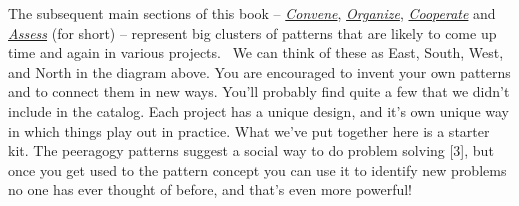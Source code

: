 The subsequent main sections of this book --
\href{http://peeragogy.org/convene/}{\emph{Convene}},
\href{http://peeragogy.org/organize/}{\emph{Organize}},
\href{http://peeragogy.org/facilitate/}{\emph{Cooperate}} and
\href{http://peeragogy.org/assessment/}{\emph{Assess}} (for short) --
represent big clusters of patterns that are likely to come up time and
again in various projects.~ We can think of these as East, South,
West, and North in the diagram above.  You are encouraged to invent
your own patterns and to connect them in new ways.  You'll probably
find quite a few that we didn't include in the catalog.  Each project
has a unique design, and it's own unique way in which things play out
in practice. What we've put together here is a starter kit.  The
peeragogy patterns suggest a social way to do problem solving [3], but
once you get used to the pattern concept you can use it to identify
new problems no one has ever thought of before, and that's even more
powerful!


